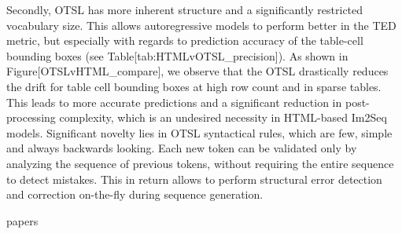 \documentclass[11pt,a4paper]{article}
\begin{document}
Secondly, OTSL has more inherent structure and a significantly restricted vocabulary size. This allows autoregressive models to perform better in the TED metric, but especially with regards to prediction accuracy of the table-cell bounding boxes (see Table[tab:HTMLvOTSL\_precision]). As shown in Figure[OTSLvHTML\_compare], we observe that the OTSL drastically reduces the drift for table cell bounding boxes at high row count and in sparse tables. This leads to more accurate predictions and a significant reduction in post-processing complexity, which is an undesired necessity in HTML-based Im2Seq models. Significant novelty lies in OTSL syntactical rules, which are few, simple and always backwards looking. Each new token can be validated only by analyzing the sequence of previous tokens, without requiring the entire sequence to detect mistakes. This in return allows to perform structural error detection and correction on-the-fly during sequence generation.

papers
\end{document}
